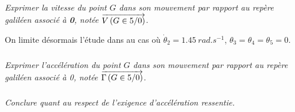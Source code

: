 \documentclass[10pt,fleqn]{article} %
\begin{document}
\begin{multicols}{2}

\subparagraph{}
\textit{Exprimer la vitesse du point $G$ dans son mouvement par rapport au repère galiléen associé à \textbf{0}, notée $\overrightarrow{V\left( {G} \in {5}/{0}\right)}$.}
\ifprof
\begin{corrige}
\end{corrige}
\else\fi

On limite désormais l'étude dans au cas où $\dot{\theta}_2 = \SI{1,45}{rad.s^{-1}}$, ${\theta}_3={\theta}_4={\theta}_5=0$.


\subparagraph{}
\textit{Exprimer l’accélération du point $G$ dans son mouvement par rapport au repère galiléen associé à 0, notée $\overrightarrow{\Gamma \left( {G} \in {5}/{0}\right)}$.}
\ifprof
\begin{corrige}
\end{corrige}
\else\fi

\subparagraph{}
\textit{Conclure quant au respect de l'exigence d'accélération ressentie. }
\ifprof
\begin{corrige}
\end{corrige}
\else\fi


\ifprof
\else
\end{multicols}
\fi


\end{document}
